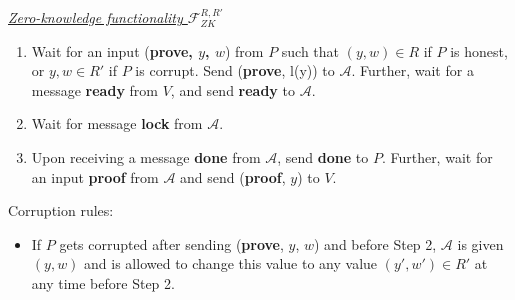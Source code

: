 \begin{tcolorbox}[colback=white, arc=5pt]
    \noindent\emph{\underline{Zero-knowledge functionality $\mathcal{F}_{ZK}^{R,R'}$}}\\[5pt]
    \begin{enumerate}
        \item Wait for an input (\textbf{prove, $y$, $w$}) from $P$ such that $(y,w)\in R$ if $P$ is honest, or ${y,w}\in R'$ if $P$ is corrupt. Send (\textbf{prove}, l(y)) to $\mathcal{A}$. Further, wait for a message \textbf{ready} from $V$, and send \textbf{ready} to $\mathcal{A}$.
        \item  Wait for message \textbf{lock} from $\mathcal{A}$.
        \item Upon receiving a message \textbf{done} from $\mathcal{A}$, send \textbf{done} to $P$. Further, wait for an input \textbf{proof} from $\mathcal{A}$ and send (\textbf{proof}, $y$) to $V$.
    \end{enumerate}

    Corruption rules:
    \begin{itemize}
        \item If $P$ gets corrupted after sending (\textbf{prove}, $y$, $w$) and before Step 2, $\mathcal{A}$ is given $(y, w)$ and is allowed to change this value to any value $(y',w')\in R'$ at any time before Step 2. 
    \end{itemize}
    
    \end{tcolorbox}
    \label{fig:zk_functionality}